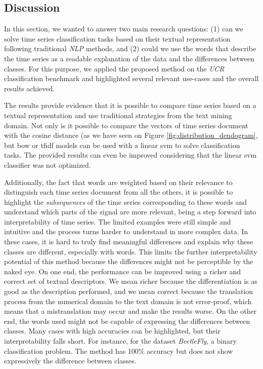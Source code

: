 
\subsection{Discussion}
\label{sec:discussion_hearts}
In this section, we wanted to answer two main research questions: (1) can we solve time series classification tasks based on their textual representation following traditional \textit{NLP} methods, and (2) could we use the words that describe the time series as a readable explanation of the data and the differences between classes. For this purpose, we applied the proposed method on the \textit{UCR} classification benchmark and highlighted several relevant use-cases and the overall results achieved.
\par
The results provide evidence that it is possible to compare time series based on a textual representation and use traditional strategies from the text mining domain. Not only is it possible to compare the vectors of time series document with the cosine distance (as we have seen on Figure \ref{fig:distribution_dendogram}, but \gls{bow} or \gls{tfidf} models can be used with a linear \gls{svm} to solve classification tasks. The provided results can even be improved considering that the linear \gls{svm} classifier was not optimized.
\par
Additionally, the fact that words are weighted based on their relevance to distinguish each time series document from all the others, it is possible to highlight the \textit{subsequences} of the time series corresponding to these words and understand which parts of the signal are more relevant, being a step forward into interpretability of time series. The limited examples were still simple and intuitive and the process turns harder to understand in more complex data. In these cases, it is hard to truly find meaningful differences and explain why these classes are different, especially with words. This limits the further interpretability potential of this method because the differences might not be perceptible by the naked eye. On one end, the performance can be improved using a richer and correct set of textual descriptors. We mean richer because the differentiation is as good as the description performed, and we mean correct because the translation process from the numerical domain to the text domain is not error-proof, which means that a mistranslation may occur and make the results worse. On the other end, the words used might not be capable of expressing the differences between classes. Many cases with high accuracies can be highlighted, but their interpretability falls short. For instance, for the dataset \textit{BeetleFly}, a binary classification problem. The method has 100\% accuracy but does not show expressively the difference between classes.
